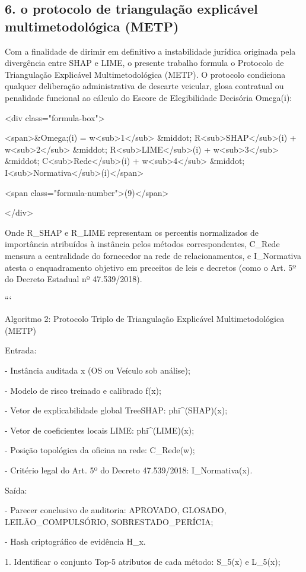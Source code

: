 \documentclass[12pt,a4paper]{article}
\begin{document}
\subsection{6. o protocolo de triangulação explicável multimetodológica (METP)}

Com a finalidade de dirimir em definitivo a instabilidade jurídica originada pela divergência entre SHAP e LIME, o presente trabalho formula o Protocolo de Triangulação Explicável Multimetodológica (METP). O protocolo condiciona qualquer deliberação administrativa de descarte veicular, glosa contratual ou penalidade funcional ao cálculo do Escore de Elegibilidade Decisória Omega(i):

<div class="formula-box">

<span>\&Omega;(i) = w<sub>1</sub> \&middot; R<sub>SHAP</sub>(i) + w<sub>2</sub> \&middot; R<sub>LIME</sub>(i) + w<sub>3</sub> \&middot; C<sub>Rede</sub>(i) + w<sub>4</sub> \&middot; I<sub>Normativa</sub>(i)</span>

<span class="formula-number">(9)</span>

</div>

Onde R\_SHAP e R\_LIME representam os percentis normalizados de importância atribuídos à instância pelos métodos correspondentes, C\_Rede mensura a centralidade do fornecedor na rede de relacionamentos, e I\_Normativa atesta o enquadramento objetivo em preceitos de leis e decretos (como o Art. 5º do Decreto Estadual nº 47.539/2018).

```

Algoritmo 2: Protocolo Triplo de Triangulação Explicável Multimetodológica (METP)

Entrada:

- Instância auditada x (OS ou Veículo sob análise);

- Modelo de risco treinado e calibrado f(x);

- Vetor de explicabilidade global TreeSHAP: phi^(SHAP)(x);

- Vetor de coeficientes locais LIME: phi^(LIME)(x);

- Posição topológica da oficina na rede: C\_Rede(w);

- Critério legal do Art. 5º do Decreto 47.539/2018: I\_Normativa(x).

Saída:

- Parecer conclusivo de auditoria: {APROVADO, GLOSADO, LEILÃO\_COMPULSÓRIO, SOBRESTADO\_PERÍCIA};

- Hash criptográfico de evidência H\_x.

1. Identificar o conjunto Top-5 atributos de cada método: S\_5(x) e L\_5(x);
\end{document}
